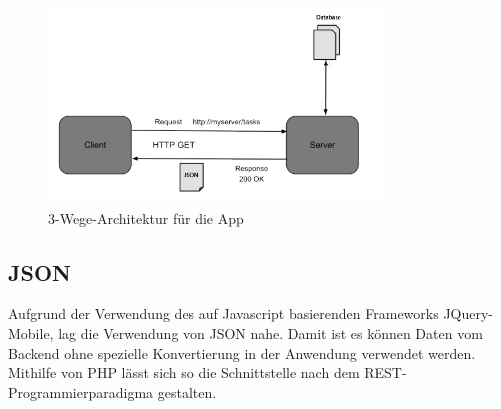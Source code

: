 \documentclass[10pt, conference, compsocconf]{IEEEtran}
\begin{document}
\begin{figure}[t]
	\centering
	\includegraphics[width=0.8\textwidth]{./Bilder_Zeichnungen/Architektur_2.png}
	\caption{3-Wege-Architektur f\"ur die App}
	\label{fig:Architektur}
\end{figure}

\subsection{JSON}
Aufgrund der Verwendung des auf Javascript basierenden Frameworks JQuery-Mobile, lag die Verwendung von JSON nahe.
Damit ist es können Daten vom Backend ohne spezielle Konvertierung in der Anwendung verwendet werden. 
Mithilfe von PHP l\"asst sich so die Schnittstelle nach dem REST-Programmierparadigma gestalten.
\end{document}
